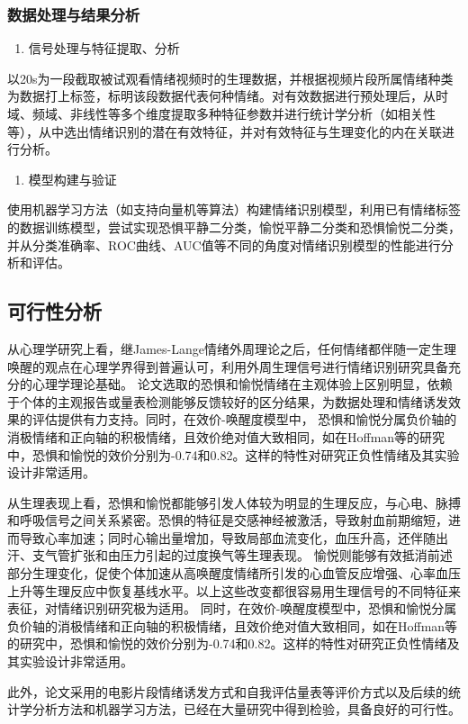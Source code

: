 \subsubsection{数据处理与结果分析}
\begin{enumerate}[\hspace{2em}1.]
    \item 信号处理与特征提取、分析
\end{enumerate}

以20s为一段截取被试观看情绪视频时的生理数据，并根据视频片段所属情绪种类为数据打上标签，标明该段数据代表何种情绪。对有效数据进行预处理后，从时域、频域、非线性等多个维度提取多种特征参数并进行统计学分析（如相关性等），从中选出情绪识别的潜在有效特征，并对有效特征与生理变化的内在关联进行分析。

\begin{enumerate}[\hspace{2em}2.]
    \item 模型构建与验证
\end{enumerate}

使用机器学习方法（如支持向量机等算法）构建情绪识别模型，利用已有情绪标签的数据训练模型，尝试实现恐惧平静二分类，愉悦平静二分类和恐惧愉悦二分类，并从分类准确率、ROC曲线、AUC值等不同的角度对情绪识别模型的性能进行分析和评估。

\subsection{可行性分析}
从心理学研究上看，继James-Lange情绪外周理论\cite{James1884}之后，任何情绪都伴随一定生理唤醒的观点在心理学界得到普遍认可，利用外周生理信号进行情绪识别研究具备充分的心理学理论基础。
论文选取的恐惧和愉悦情绪在主观体验上区别明显，依赖于个体的主观报告或量表检测能够反馈较好的区分结果，为数据处理和情绪诱发效果的评估提供有力支持。同时，在效价-唤醒度模型中，
恐惧和愉悦分属负价轴的消极情绪和正向轴的积极情绪，且效价绝对值大致相同，如在Hoffman等\cite{Hoffmann2012}的研究中，恐惧和愉悦的效价分别为-0.74和0.82。这样的特性对研究正负性情绪及其实验设计非常适用。

从生理表现上看，恐惧和愉悦都能够引发人体较为明显的生理反应，与心电、脉搏和呼吸信号之间关系紧密。恐惧的特征是交感神经被激活，导致射血前期缩短，进而导致心率加速；同时心输出量增加，导致局部血流变化，血压升高，还伴随出汗、支气管扩张和由压力引起的过度换气等生理表现\cite{Curtis2002}。
愉悦则能够有效抵消前述部分生理变化，促使个体加速从高唤醒度情绪所引发的心血管反应增强、心率血压上升等生理反应中恢复基线水平。以上这些改变都很容易用生理信号的不同特征来表征，对情绪识别研究极为适用。
同时，在效价-唤醒度模型中，恐惧和愉悦分属负价轴的消极情绪和正向轴的积极情绪，且效价绝对值大致相同，如在Hoffman等的研究中，恐惧和愉悦的效价分别为-0.74和0.82。这样的特性对研究正负性情绪及其实验设计非常适用。

此外，论文采用的电影片段情绪诱发方式和自我评估量表等评价方式以及后续的统计学分析方法和机器学习方法，已经在大量研究中得到检验，具备良好的可行性。